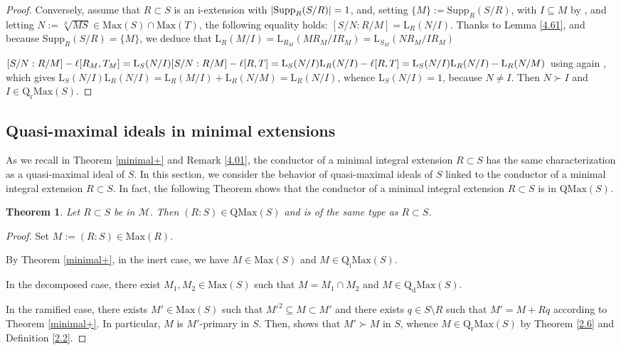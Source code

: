 \documentclass[12pt,leqno]{amsart}
\newtheorem{theorem}{Theorem}[section]
\theoremstyle{definition}
\begin{document}
\begin{proof}
Conversely, assume that $R\subset S$ is an i-extension with $|\mathrm {Supp}_R(S/R)|\\=1$, and, setting $\{M\}:=\mathrm{Supp}_R(S/R)$, with $I\subseteq M$ by \cite[Proposition 5.7 and Example 5.15]{Pic 18}, and letting $N:=\sqrt[S]{MS}\in\mathrm{Max}(S)\cap\mathrm{Max}(T)$, the following equality holds: $[S/N:R/M]=\mathrm{L}_{R}(N/I)$. Thanks to Lemma \ref{4.61}, \cite[Theorem 13, p. 168]{N} and because $\mathrm {Supp}_R(S/R)=\{M\}$, we deduce that $\mathrm{L}_R(M/I)=\mathrm{L}_{R_M}(MR_M/IR_M)=\mathrm{L}_{S_M}(NR_M/IR_M)$

\noindent$[S/N:R/M]-\ell[R_M,T_M]=\mathrm{L}_S (N/I)[S/N:R/M]-\ell[R,T]=\mathrm{L}_S(N/I)\\ \mathrm{L}_R(N/I)-\ell[R,T]=\mathrm{L}_S(N/I)\mathrm {L}_R(N/I)-\mathrm{L}_R(N/M)$ using again \cite[Lemma 5.4]{DPP2}, which gives $\mathrm{L}_S(N/I)\mathrm{L}_R(N/I)=\mathrm{L}_R(M/I)+\mathrm{L}_R(N/M)=\mathrm{L}_R(N/I)$, whence $\mathrm{L}_S(N/I)=1$, because $N\neq I$. Then $N\succ I$ and $I\in\mathrm{Q_rMax}(S)$.
\end{proof} 

\subsection{Quasi-maximal ideals in minimal  extensions}

As we recall in Theorem \ref{minimal+} and Remark \ref{4.01}, the conductor of a minimal integral extension $R\subset S$ has the same characterization as a quasi-maximal ideal of $S$. In this section, we consider the behavior of quasi-maximal ideals of $S$ linked to the conductor of a minimal integral extension $R\subset S$. In fact, the following Theorem shows that the conductor of a minimal integral extension $R\subset S$ is in $\mathrm{QMax}(S)$.

\begin{theorem}\label{4.1} Let $R\subset S$ be in $\mathcal M$. Then $(R:S)\in\mathrm{QMax}(S)$ and is of the same type as   $R\subset S$. 
\end{theorem}
\begin{proof} Set $M:=(R:S)\in\mathrm{Max}(R)$. 

By Theorem \ref{minimal+}, in the inert case, we have $M\in\mathrm{Max}(S)$ and $M\in\mathrm{Q_iMax}(S)$. 

In the decomposed case, there exist $M_1,M_2\in\mathrm{Max}(S)$ such that $M=M_1\cap M_2$ and $M\in\mathrm{Q_dMax}(S)$. 

In the ramified case, there exists $M'\in\mathrm{Max}(S)$ such that $M'^2 \subseteq M\subset M'$ and there exists $q\in S\setminus R$ such that $ M'=M+Rq$ according to Theorem \ref{minimal+}. In particular, $M$ is $M' $-primary in $S$. Then, \cite[Corollary 2, p.237]{ZS} shows that $M'\succ M$ in $S$, whence $M\in\mathrm{Q_rMax}(S)$ by Theorem \ref{2.6} and Definition \ref{2.2}.
\end{proof}
\end{document}
